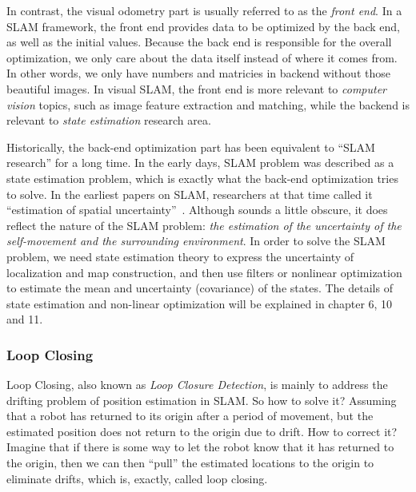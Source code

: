 In contrast, the visual odometry part is usually referred to as the \emph{front end}. In a SLAM framework, the front end provides data to be optimized by the back end, as well as the initial values. Because the back end is responsible for the overall optimization, we only care about the data itself instead of where it comes from. In other words, we only have numbers and matricies in backend without those beautiful images. In visual SLAM, the front end is more relevant to \emph{computer vision} topics, such as image feature extraction and matching, while the backend is relevant to \emph{state estimation} research area.

Historically, the back-end optimization part has been equivalent to ``SLAM research'' for a long time. In the early days, SLAM problem was described as a state estimation problem, which is exactly what the back-end optimization tries to solve. In the earliest papers on SLAM, researchers at that time called it ``estimation of spatial uncertainty''~\cite{Smith1986, Smith1990}. Although sounds a little obscure, it does reflect the nature of the SLAM problem: \emph{the estimation of the uncertainty of the self-movement and the surrounding environment}. In order to solve the SLAM problem, we need state estimation theory to express the uncertainty of localization and map construction, and then use filters or nonlinear optimization to estimate the mean and uncertainty (covariance) of the states. The details of state estimation and non-linear optimization will be explained in chapter 6, 10 and 11.

\subsubsection{Loop Closing}
Loop Closing, also known as \emph{Loop Closure Detection}, is mainly to address the drifting problem of position estimation in SLAM. So how to solve it? Assuming that a robot has returned to its origin after a period of movement, but the estimated position does not return to the origin due to drift. How to correct it? Imagine that if there is some way to let the robot know that it has returned to the origin, then we can then ``pull'' the estimated locations to the origin to eliminate drifts, which is, exactly, called loop closing.

